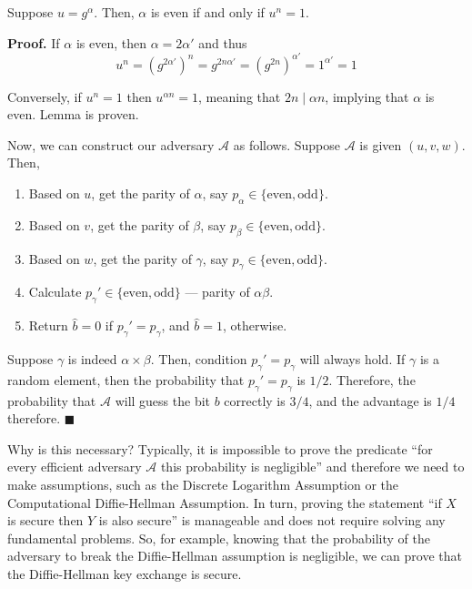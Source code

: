 \documentclass[../lecture-notes-148x210.tex]{subfiles}
\begin{document}
\begin{lemma}
    Suppose $u=g^{\alpha}$. Then, $\alpha$ is even if and only if $u^n = 1$.
\end{lemma}

\textbf{Proof.} If $\alpha$ is even, then $\alpha = 2\alpha'$ and thus
\begin{equation*}
    u^n = (g^{2\alpha'})^n = g^{2n\alpha'} = (g^{2n})^{\alpha'} = 1^{\alpha'} = 1
\end{equation*}

Conversely, if $u^n = 1$ then $u^{\alpha n}=1$, meaning that $2n \mid \alpha n$, implying that $\alpha$ is even. 
Lemma is proven.

Now, we can construct our adversary $\mathcal{A}$ as follows. Suppose $\mathcal{A}$ is given $(u,v,w)$. Then,
\begin{enumerate}
    \item Based on $u$, get the parity of $\alpha$, say $p_{\alpha} \in \{\text{even}, \text{odd}\}$.
    \item Based on $v$, get the parity of $\beta$, say $p_{\beta} \in \{\text{even}, \text{odd}\}$.
    \item Based on $w$, get the parity of $\gamma$, say $p_{\gamma} \in \{\text{even}, \text{odd}\}$.
    \item Calculate $p_{\gamma}'\in \{\text{even}, \text{odd}\}$ --- parity of $\alpha\beta$.
    \item Return $\hat{b}=0$ if $p_{\gamma}' = p_{\gamma}$, and $\hat{b}=1$, otherwise.
\end{enumerate}

Suppose $\gamma$ is indeed $\alpha \times \beta$. Then, condition $p_{\gamma}'=p_{\gamma}$ will always hold. 
If $\gamma$ is a random element, then the probability that $p_{\gamma}'=p_{\gamma}$ is $1/2$. Therefore, the 
probability that $\mathcal{A}$ will guess the bit $b$ correctly is $3/4$, and the advantage is $1/4$ therefore. 
$\blacksquare$

\vspace{10pt}

Why is this necessary? Typically, it is impossible to prove the predicate ``for every efficient adversary 
$\mathcal{A}$ this probability is negligible'' and therefore we need to make assumptions, such as the Discrete 
Logarithm Assumption or the Computational Diffie-Hellman Assumption. In turn, proving the statement ``if $X$ is 
secure then $Y$ is also secure'' is manageable and does not require solving any fundamental problems. So, for 
example, knowing that the probability of the adversary to break the Diffie-Hellman assumption is negligible, we 
can prove that the Diffie-Hellman key exchange is secure. 
\end{document}
